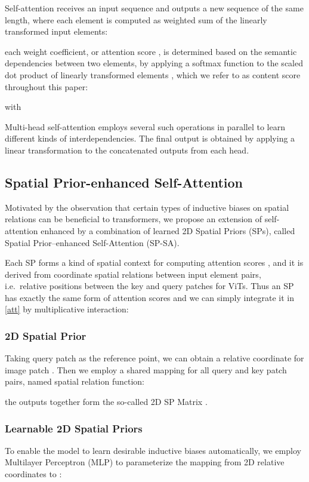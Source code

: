 \documentclass[authorversion, sigconf, acmthm=false, nonacm=true]{acmart}
\begin{document}
Self-attention receives an input sequence  and outputs a new sequence  of the same length, where each element is computed as weighted sum of the linearly transformed input elements:

each weight coefficient, or attention score , is determined based on the semantic dependencies between two elements, by applying a softmax function to
the scaled dot product of linearly transformed elements , which we refer to as content score throughout this paper:


 with
 

Multi-head self-attention employs several such operations in parallel to learn different kinds of interdependencies. 
The final output is obtained by applying a linear transformation to the concatenated outputs from each head.










\subsection{Spatial Prior-enhanced Self-Attention}


Motivated by the observation that certain types of inductive biases on spatial relations can be beneficial to transformers,
we propose an extension of self-attention enhanced by a combination of learned 2D Spatial Priors (SPs), called Spatial Prior–enhanced Self-Attention (SP-SA).

Each SP  forms a kind of spatial context for computing attention scores , 
and it is derived from coordinate spatial relations between input element pairs,
i.e.~relative positions between the key and query patches for ViTs.
Thus an SP has exactly the same form of attention scores and we can simply integrate it in \cref{att} by multiplicative interaction:



\subsubsection{2D Spatial Prior}
Taking query patch  as the reference point, we can obtain a relative coordinate  for image patch . 
Then we employ a shared mapping  for all query and key patch pairs, named spatial relation function:


the outputs together form the so-called 2D SP Matrix .


\subsubsection{Learnable 2D Spatial Priors}
To enable the model to learn desirable inductive biases automatically, we 
employ Multilayer Perceptron (MLP) to parameterize the mapping from 2D relative coordinates to :
\end{document}
